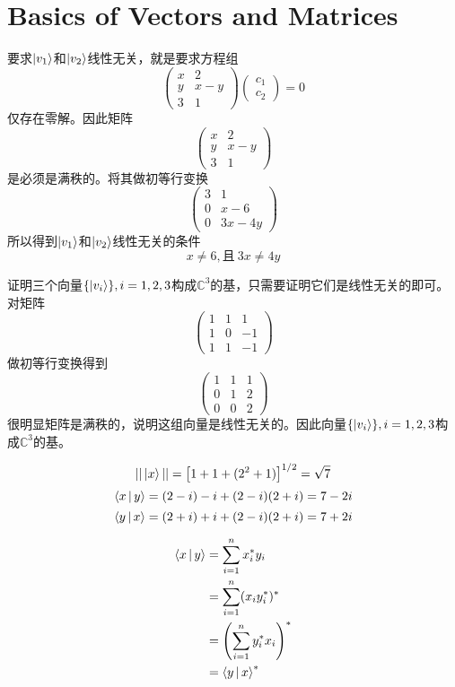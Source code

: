 \section{Basics of Vectors and Matrices}
\exercise

要求$\ket{v_1}$和$\ket{v_2}$线性无关，就是要求方程组
\[
\begin{pmatrix}
x & 2 \\
y & x - y \\
3 & 1
\end{pmatrix}
\begin{pmatrix}
c_1 \\ c_2
\end{pmatrix}
= 0
\]
仅存在零解。因此矩阵
\[
\begin{pmatrix}
x & 2 \\
y & x - y \\
3 & 1
\end{pmatrix}
\]
是必须是满秩的。将其做初等行变换
\[
\begin{pmatrix}
3 & 1 \\
0 & x - 6 \\
0 & 3x - 4y
\end{pmatrix}
\]
所以得到$\ket{v_1}$和$\ket{v_2}$线性无关的条件
\[
x \neq 6, \text{且}\ 3x \neq 4y
\]

\exercise

证明三个向量$\{\ket{v_i}\}, i = 1, 2, 3$构成$\mathbb{C}^3$的基，只需要证明它们是线性无关的即可。对矩阵
\[
\begin{pmatrix}
1 & 1 & 1 \\
1 & 0 & -1 \\
1 & 1 & -1
\end{pmatrix}
\]
做初等行变换得到
\[
\begin{pmatrix}
1 & 1 & 1 \\
0 & 1 & 2 \\
0 & 0 & 2
\end{pmatrix}
\]
很明显矩阵是满秩的，说明这组向量是线性无关的。因此向量$\{\ket{v_i}\}, i = 1, 2, 3$构成$\mathbb{C}^3$的基。

\exercise
\[
||\ket{x}|| = \left[1 + 1 + (2^2 + 1)\right]^{1/2} = \sqrt{7}
\]
\[
\Braket{x|y} = (2 - i) -i + (2 - i)(2 + i) = 7 - 2i
\]
\[
\Braket{y|x} = (2 + i) + i + (2 - i)(2 + i) = 7 + 2i
\]

\exercise
\[
\begin{split}
\Braket{x|y} &= \sum\limits_{i=1}^n x_i^* y_i \\
&= \sum\limits_{i=1}^n (x_i y_i^*)^* \\
&= \left(\sum\limits_{i=1}^n y_i^* x_i \right)^* \\
&= \Braket{y|x}^*
\end{split}
\]


